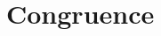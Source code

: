 \documentclass[../I&R.tex]{subfiles}
\begin{document}
\chapter{Congruence}

\subsection*{}
\end{document}
